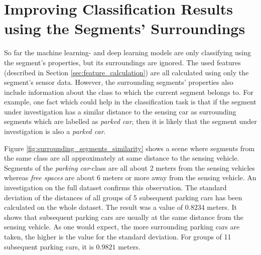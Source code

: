 







\section{Improving Classification Results using the Segments' Surroundings}
\label{sec:improv_classification_surrounding_segments}

So far the machine learning- and deep learning models are only classifying using the segment's properties, but its surroundings are ignored. The used features (described in Section \ref{sec:feature_calculation}) are all calculated using only the segment's sensor data. However, the surrounding segments' properties also include information about the class to which the current segment belongs to. 
For example, one fact which could help in the classification task is that if the segment under investigation has a similar distance to the sensing car as surrounding segments which are labelled as \emph{parked car}, then it is likely that the segment under investigation is also a \emph{parked car}. 

Figure \ref{fig:surrounding_segments_similarity} shows a scene where segments from the same class are all approximately at same distance to the sensing vehicle. Segments of the \emph{parking car}-class are all about 2 meters from the sensing vehicles whereas \emph{free spaces} are about 6 meters or more away from the sensing vehicle. An investigation on the full dataset confirms this observation. The standard deviation of the distances of all groups of 5 subsequent parking cars has been calculated on the whole dataset. The result was a value of $0.8234$ meters. It shows that subsequent parking cars are usually at the same distance from the sensing vehicle. As one would expect, the more surrounding parking cars are taken, the higher is the value for the standard deviation. For groups of 11 subsequent parking cars, it is $0.9821$ meters.

